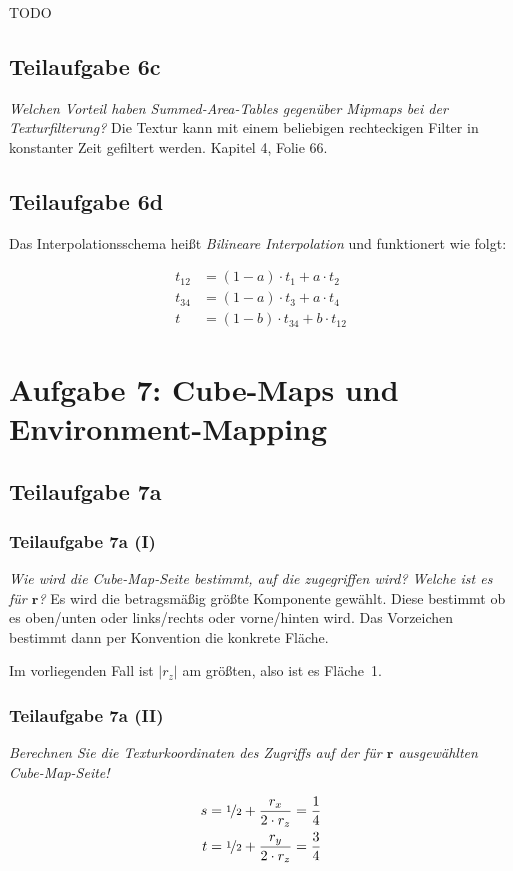 \documentclass[a4paper]{scrartcl}
\begin{document}
TODO


\subsection*{Teilaufgabe 6c}
\textit{Welchen Vorteil haben Summed-Area-Tables gegenüber Mipmaps bei der Texturfilterung?}
Die Textur kann mit einem beliebigen rechteckigen Filter in konstanter Zeit gefiltert werden. Kapitel 4, Folie 66.

\subsection*{Teilaufgabe 6d}
Das Interpolationsschema heißt \textit{Bilineare Interpolation} und funktionert
wie folgt:

\begin{align}
    t_{12} &= (1-a) \cdot t_1 + a \cdot t_2\\
    t_{34} &= (1-a) \cdot t_3 + a \cdot t_4\\
    t      &= (1-b) \cdot t_{34} + b \cdot t_{12}
\end{align}

\section*{Aufgabe 7: Cube-Maps und Environment-Mapping}
\subsection*{Teilaufgabe 7a}
\subsubsection*{Teilaufgabe 7a (I)}
\textit{Wie wird die Cube-Map-Seite bestimmt, auf die zugegriffen wird? Welche ist es für $\mathbf{r}$?}
Es wird die betragsmäßig größte Komponente gewählt. Diese bestimmt ob es
oben/unten oder links/rechts oder vorne/hinten wird. Das Vorzeichen bestimmt
dann per Konvention die konkrete Fläche.

Im vorliegenden Fall ist $|r_z|$ am größten, also ist es Fläche~1.

\subsubsection*{Teilaufgabe 7a (II)}
\textit{Berechnen Sie die Texturkoordinaten des Zugriffs auf der für $\mathbf{r}$ ausgewählten Cube-Map-Seite!}

\begin{align}
    s &= \nicefrac{1}{2} + \frac{r_x}{2 \cdot r_z} = \frac{1}{4}\\
    t &= \nicefrac{1}{2} + \frac{r_y}{2 \cdot r_z} = \frac{3}{4}
\end{align}
\end{document}
